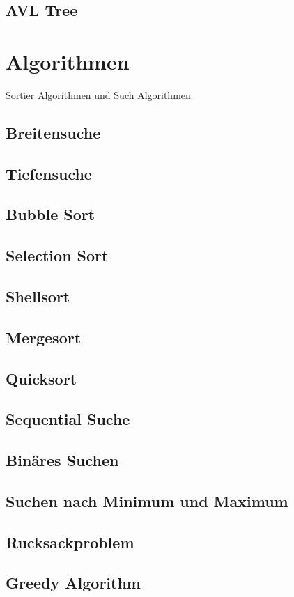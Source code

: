 \documentclass[babel]{book}
\begin{document}
\section{AVL Tree}

\chapter{Algorithmen}
Sortier Algorithmen und Such Algorithmen
\section{Breitensuche}
\section{Tiefensuche}
\section{Bubble Sort}
\section{Selection Sort}
\section{Shellsort}
\section{Mergesort}
\section{Quicksort}
\section{Sequential Suche}
\section{Binäres Suchen}
\section{Suchen nach Minimum und Maximum}
\section{Rucksackproblem}
\section{Greedy Algorithm}
\end{document}
